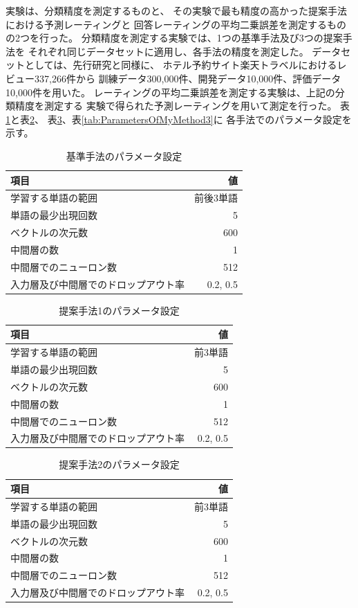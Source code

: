 \documentclass{ttithesis}
\begin{document}
 実験は、分類精度を測定するものと、
その実験で最も精度の高かった提案手法における予測レーティングと
回答レーティングの平均二乗誤差を測定するものの2つを行った。
 分類精度を測定する実験では、1つの基準手法及び3つの提案手法を
それぞれ同じデータセットに適用し、各手法の精度を測定した。
データセットとしては、先行研究\cite{fujitani15}と同様に、
ホテル予約サイト楽天トラベルにおけるレビュー337,266件から
訓練データ300,000件、開発データ10,000件、評価データ10,000件を用いた。
 レーティングの平均二乗誤差を測定する実験は、上記の分類精度を測定する
実験で得られた予測レーティングを用いて測定を行った。
 表\ref{tab:ParametersOfBaselineMethod}と表\ref{tab:ParametersOfMyMethod1}、
表\ref{tab:ParametersOfMyMethod2}、表\ref{tab:ParametersOfMyMethod3}に
各手法でのパラメータ設定を示す。

\begin{table}
  \caption{基準手法のパラメータ設定}
  \begin{tabular}{l | r}\label{tab:ParametersOfBaselineMethod}
    項目 & 値 \\
    \hline
    学習する単語の範囲 & 前後3単語 \\
    単語の最少出現回数 & 5 \\
    ベクトルの次元数 & 600 \\
    中間層の数 & 1 \\
    中間層でのニューロン数 & 512 \\
    入力層及び中間層でのドロップアウト率 & 0.2, 0.5 \\
  \end{tabular}
\end{table}

\begin{table}
  \caption{提案手法1のパラメータ設定}
  \begin{tabular}{l | r}\label{tab:ParametersOfMyMethod1}
    項目 & 値 \\
    \hline
    学習する単語の範囲 & 前3単語 \\
    単語の最少出現回数 & 5 \\
    ベクトルの次元数 & 600 \\
    中間層の数 & 1 \\
    中間層でのニューロン数 & 512 \\
    入力層及び中間層でのドロップアウト率 & 0.2, 0.5 \\
  \end{tabular}
\end{table}

\begin{table}
  \caption{提案手法2のパラメータ設定}
  \begin{tabular}{l | r}\label{tab:ParametersOfMyMethod2}
    項目 & 値 \\
    \hline
    学習する単語の範囲 & 前3単語 \\
    単語の最少出現回数 & 5 \\
    ベクトルの次元数 & 600 \\
    中間層の数 & 1 \\
    中間層でのニューロン数 & 512 \\
    入力層及び中間層でのドロップアウト率 & 0.2, 0.5 \\
  \end{tabular}
\end{table}
\end{document}
